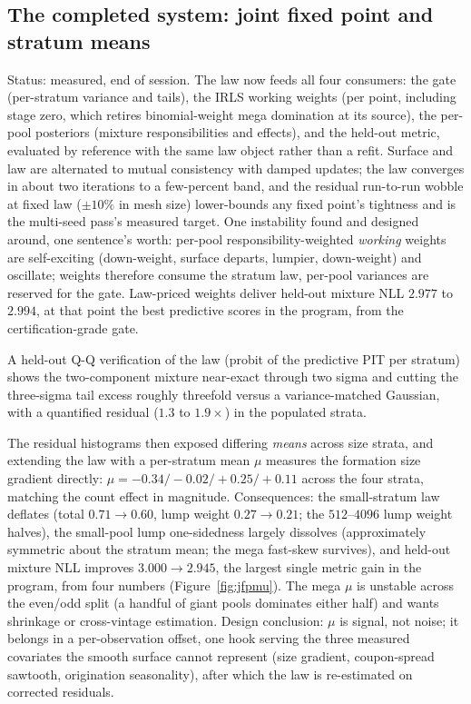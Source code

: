 \documentclass[11pt]{article}
\begin{document}
\subsection*{The completed system: joint fixed point and stratum means}

Status: measured, end of session. The law now feeds all four consumers:
the gate (per-stratum variance and tails), the IRLS working weights
(per point, including stage zero, which retires binomial-weight mega
domination at its source), the per-pool posteriors (mixture
responsibilities and effects), and the held-out metric, evaluated by
reference with the same law object rather than a refit. Surface and law
are alternated to mutual consistency with damped updates; the law
converges in about two iterations to a few-percent band, and the
residual run-to-run wobble at fixed law ($\pm10\%$ in mesh size)
lower-bounds any fixed point's tightness and is the multi-seed pass's
measured target. One instability found and designed around, one
sentence's worth: per-pool responsibility-weighted \emph{working}
weights are self-exciting (down-weight, surface departs, lumpier,
down-weight) and oscillate; weights therefore consume the stratum law,
per-pool variances are reserved for the gate. Law-priced weights
deliver held-out mixture NLL $2.977$ to $2.994$, at that point the best
predictive scores in the program, from the certification-grade gate.

A held-out Q-Q verification of the law (probit of the predictive PIT
per stratum) shows the two-component mixture near-exact through two
sigma and cutting the three-sigma tail excess roughly threefold versus
a variance-matched Gaussian, with a quantified residual ($1.3$ to
$1.9\times$) in the populated strata.

The residual histograms then exposed differing \emph{means} across size
strata, and extending the law with a per-stratum mean $\mu$ measures
the formation size gradient directly: $\mu = -0.34 / -0.02 / +0.25 /
+0.11$ across the four strata, matching the count effect in magnitude.
Consequences: the small-stratum law deflates (total $0.71\to0.60$,
lump weight $0.27\to0.21$; the $512$--$4096$ lump weight halves), the
small-pool lump one-sidedness largely dissolves (approximately
symmetric about the stratum mean; the mega fast-skew survives), and
held-out mixture NLL improves $3.000\to2.945$, the largest single
metric gain in the program, from four numbers
(Figure~\ref{fig:jfpmu}). The mega $\mu$ is unstable across the
even/odd split (a handful of giant pools dominates either half) and
wants shrinkage or cross-vintage estimation. Design conclusion: $\mu$
is signal, not noise; it belongs in a per-observation offset, one hook
serving the three measured covariates the smooth surface cannot
represent (size gradient, coupon-spread sawtooth, origination
seasonality), after which the law is re-estimated on corrected
residuals.
\end{document}
